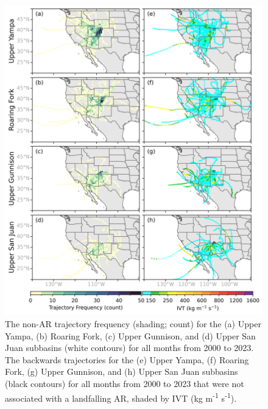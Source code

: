 \documentclass[jgrga]{agutexSI2019}
\begin{document}
\begin{article}
\begin{figure}
\noindent\includegraphics[scale=0.8]{figS4.png}
\caption{The non-AR trajectory frequency (shading; count) for the (a) Upper Yampa, (b) Roaring Fork, (c) Upper Gunnison, and (d) Upper San Juan subbasins (white contours) for all months from 2000 to 2023. The backwards trajectories for the (e) Upper Yampa, (f) Roaring Fork, (g) Upper Gunnison, and (h) Upper San Juan subbasins (black contours) for all months from 2000 to 2023 that were not associated with a landfalling AR, shaded by IVT (kg m\textsuperscript{-1} s\textsuperscript{-1}).}
\label{fig:individual_subbasins}
\end{figure}
\clearpage


\end{article}
\end{document}
